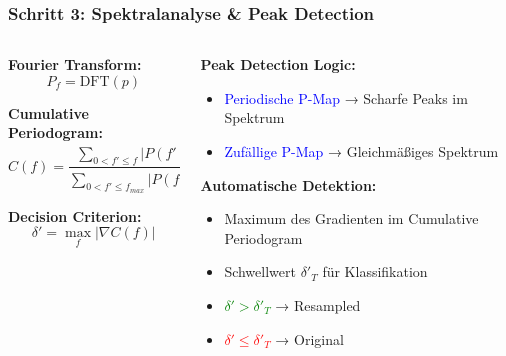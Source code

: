 \documentclass[11pt,t,usepdftitle=false,aspectratio=169]{beamer}
\begin{document}
\begin{frame}
	\frametitle{Schritt 3: Spektralanalyse \& Peak Detection}
	
	\begin{columns}[T]
		\begin{column}{0.45\textwidth}
			\textbf{Fourier Transform:}
			$$P_f = \text{DFT}(p)$$
			
			\vspace{0.5em}
			\textbf{Cumulative Periodogram:}
			$$C(f) = \frac{\sum_{0<f' \leq f} |P(f')|^2}{\sum_{0<f' \leq f_{max}} |P(f')|^2}$$
			
			\vspace{0.5em}
			\textbf{Decision Criterion:}
			$$\delta' = \max_f |\nabla C(f)|$$
		\end{column}
		\begin{column}{0.5\textwidth}
			\textbf{Peak Detection Logic:}
			\begin{itemize}
				\item \textcolor{blue}{Periodische P-Map} → Scharfe Peaks im Spektrum
				\item \textcolor{blue}{Zufällige P-Map} → Gleichmäßiges Spektrum
			\end{itemize}
			
			\vspace{0.5em}
			\textbf{Automatische Detektion:}
			\begin{itemize}
				\item Maximum des Gradienten im Cumulative Periodogram
				\item Schwellwert $\delta'_T$ für Klassifikation
				\item \textcolor{green}{$\delta' > \delta'_T$} → Resampled
				\item \textcolor{red}{$\delta' \leq \delta'_T$} → Original
			\end{itemize}
		\end{column}
	\end{columns}
\end{frame}
\end{document}
